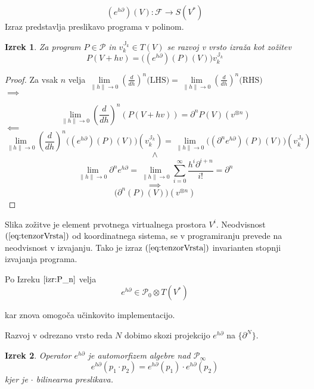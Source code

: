 \documentclass{article}
\newcommand{\JJ}{\mathbb{J}}
\newcommand{\F}{\mathcal{F}}
\newcommand{\dP}{\mathcal{P}}
\newcommand{\D}{\partial}
\newtheorem{izrek}{Izrek}[section]
\begin{document}
 \begin{equation}\label{eq:pToPol}
 	(e^{h\D})(V): \F\to S(V^*)
 \end{equation}
 Izraz predstavlja preslikavo programa v polinom.
 
\begin{izrek}\label{izr:e^d}
	Za program $P\in\dP$ in $v^{\JJ_k}_{k}\in T(V)$ se razvoj v vrsto izraža kot zožitev\\
	\begin{equation}\label{eq:tenzorVrsta}
	P(V+hv) = \Big((e^{h\D})(P)(V)\Big)v^{\JJ_k}_{k}
	\end{equation}
\end{izrek}
 
 \begin{proof}
 Za vsak $n$ velja $\lim\limits_{\lVert h\rVert\to 0}(\frac{d}{dh})^n\text{(LHS)}=\lim\limits_{\lVert h\rVert\to 0}(\frac{d}{dh})^n\text{(RHS)}$\\
 $\implies$
 
 $$\lim\limits_{\lVert h\rVert\to 0}(\frac{d}{dh})^n(P(V+hv))=\D^n P(V)(v^{\otimes n})$$
 $\impliedby$
 $$\lim\limits_{\lVert h\rVert\to 0}(\frac{d}{dh})^n\Big((e^{h\D})(P)(V)\Big)(v^{\JJ_k}_{k})=\lim\limits_{\lVert h\rVert\to 0}\Big((\D^n e^{h\D})(P)(V)\Big)(v^{\JJ_k}_{k})$$
 $$\land$$
 $$\lim\limits_{\lVert h\rVert\to 0}\D^ne^{h\D}=\lim\limits_{\lVert h\rVert\to 0}\sum\limits_{i=0}^{\infty}\frac{h^i\D^{i+n}}{i!}=\D^n$$
 $$\implies$$
 $$\Big(\D^n(P)(V)\Big)(v^{\otimes n})$$
 \end{proof}
  
 Slika zožitve je element prvotnega virtualnega prostora $V^i$. Neodvisnost $(\ref{eq:tenzorVrsta})$ od koordinatnega sistema, se v programiranju prevede na neodvisnost v izvajanju. Tako je izraz $(\ref{eq:tenzorVrsta})$ invarianten stopnji izvajanja programa.   
 
 Po Izreku $\ref{izr:P_n}$ velja
     \begin{equation}
     	e^{h\D}\in\dP_0\otimes T(V^*)
     \end{equation} 
     
kar znova omogoča učinkovito implementacijo.

 Razvoj v odrezano vrsto reda $N$ dobimo skozi projekcijo $e^{h\D}$ na $\{\D^N \}$. 
 
 \begin{izrek}\label{izr:prod}
 Operator $e^{h\D}$ je automorfizem algebre nad $\dP_\infty$
 \begin{equation}
 	e^{h\D}(p_1\cdot p_2)=e^{h\D}(p_1)\cdot e^{h\D}(p_2)
 \end{equation}
 kjer je $\cdot$ bilinearna preslikava.
 \end{izrek}
 
\end{document}
